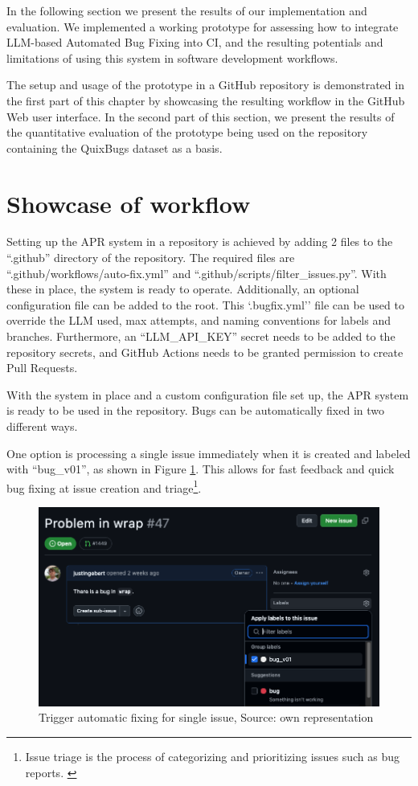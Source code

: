 In the following section we present the results of our implementation and evaluation. We implemented a working prototype for assessing how to integrate LLM-based Automated Bug Fixing into \ac{CI}, and the resulting potentials and limitations of using this system in software development workflows.

The setup and usage of the prototype in a GitHub repository is demonstrated in the first part of this chapter by showcasing the resulting workflow in the GitHub Web user interface. In the second part of this section, we present the results of the quantitative evaluation of the prototype being used on the repository containing the QuixBugs dataset as a basis.

\section{Showcase of workflow} \label{section:showcase}

Setting up the APR system in a repository is achieved by adding 2 files to the ``.github'' directory of the repository. The required files are ``.github/workflows/auto-fix.yml'' and ``.github/scripts/filter\_issues.py''. With these in place, the system is ready to operate. Additionally, an optional configuration file can be added to the root. This `.bugfix.yml'' file can be used to override the \ac{LLM} used, max attempts, and naming conventions for labels and branches. Furthermore, an ``LLM\_API\_KEY'' secret needs to be added to the repository secrets, and GitHub Actions needs to be granted permission to create Pull Requests.

With the system in place and a custom configuration file set up, the APR system is ready to be used in the repository. Bugs can be automatically fixed in two different ways.

One option is processing a single issue immediately when it is created and labeled with ``bug\_v01'', as shown in Figure \ref{fig:issue-trigger}. This allows for fast feedback and quick bug fixing at issue creation and triage\footnote{Issue triage is the process of categorizing and prioritizing issues such as bug reports. \cite{IssuesTriaging}}.

\begin{figure}[H]
    \centering
    \includegraphics[width=1\textwidth]{images/workflow/label_issue.png}
    \caption{Trigger automatic fixing for single issue, Source: own representation}
    \label{fig:issue-trigger}
\end{figure}

